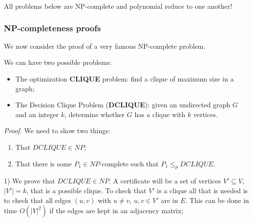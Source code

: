All problems below are NP-complete and polynomial reduce to one another!

\subsubsection{NP-completeness proofs}
We now consider the proof of a very famous NP-complete problem.


We can have two possible problems:
\begin{itemize}
    \item The optimization \textbf{CLIQUE} problem: find a clique of maximum size in a graph;
    \item The Decision Clique Problem (\textbf{DCLIQUE}): given an undirected graph $G$ and an integer $k$, determine whether $G$ has a clique with $k$ vertices. 
\end{itemize}


\textit{Proof.}
We need to show two things: 
\begin{enumerate}
    \item That $DCLIQUE \in NP$;
    \item That there is some $P_1 \in NP$-complete such that $P_1 \leq_p DCLIQUE$. 
\end{enumerate}

1) We prove that $DCLIQUE \in NP$. A certificate will be a set of vertices $V' \subseteq V$, $|V'|=k$, that is a possible clique. To check that $V'$ is a clique all that is needed is to check that all edges $(u,v)$ with $u \neq v$, $u,v \in V'$ are in $E$. This can be done in time $O(|V|^2)$ if the edges are kept in an adjacency matrix;

